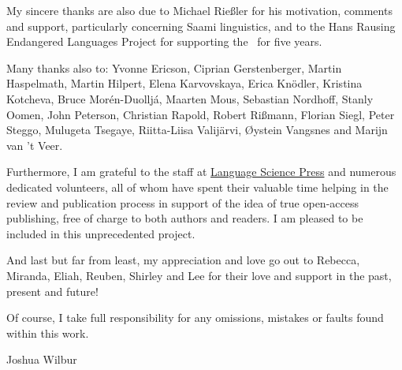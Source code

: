 My sincere thanks are also due %
to Michael Rießler for his motivation, comments and support, particularly concerning Saami linguistics, and 
to the Hans Rausing Endangered Languages Project for supporting the \PSDP\ for five years. 

\begin{sloppypar}
Many thanks also to:
Yvonne Ericson, 
Ciprian Gerstenberger, 
Martin Haspelmath, 
Martin Hilpert, 
Elena Karvovskaya, 
Erica Knödler, 
Kristina Kotcheva, 
Bruce Morén-Duoll\-já, 
Maar\-ten Mous, 
Sebastian Nordhoff, 
Stanly Oomen, 
John Peterson, 
Christian Rapold, 
Robert Rißmann, 
Florian Siegl, 
Peter Steggo, 
Mulugeta Tsegaye, 
Riitta-Liisa Valijärvi, 
Øystein Vangs\-nes 
and 
Marijn van ’t Veer. 
\end{sloppypar}

Furthermore, I am grateful to the staff at \href{http://langsci-press.org/}{Language Science Press} and numerous dedicated volunteers, all of whom have spent their valuable time helping in the review and publication process in support of the idea of true open-access publishing, free of charge to both authors and readers. I am pleased to be included in this unprecedented project. 

And last but far from least, my appreciation and love go out to Rebecca, Miranda, Eliah, Reuben, Shirley and Lee for their love and support in the past, present and future!

Of course, I take full responsibility for any omissions, mistakes or faults found within this work. 

\hfill Joshua Wilbur

\hfill {}










%